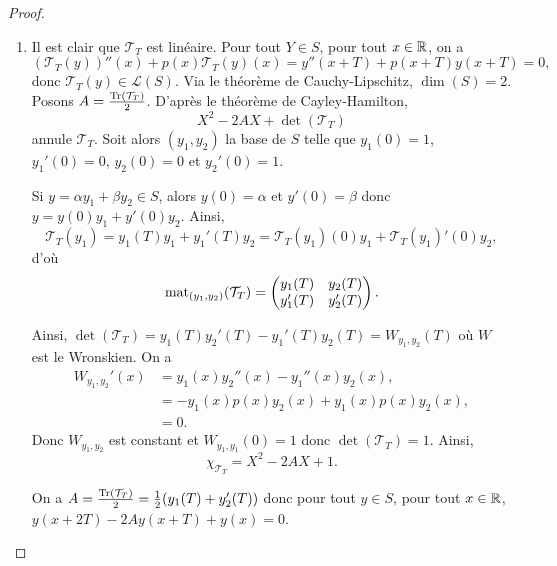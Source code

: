 \documentclass[12pt]{article}
\begin{document}
\begin{proof}
	\phantom{}
	\begin{enumerate}
		\item Il est clair que $\mathcal{T}_{T}$ est linéaire. Pour tout $Y\in S$, pour tout $x\in\mathbb{R}$, on a 
		\begin{equation*}
			(\mathcal{T}_{T}(y))''(x)+p(x)\mathcal{T}_{T}(y)(x)=y''(x+T)+p(x+T)y(x+T)=0,
		\end{equation*}
		donc $\mathcal{T}_{T}(y)\in\mathcal{L}(S)$. Via le théorème de Cauchy-Lipschitz, $\dim(S)=2$. Posons $A=\frac{\operatorname{Tr}(\mathcal{T}_T)}{2}$. D'après le théorème de Cayley-Hamilton, 
		\begin{equation*}
			X^{2}-2AX+\det(\mathcal{T}_T)
		\end{equation*}
		annule $\mathcal{T}_T$. Soit alors $(y_1,y_2)$ la base de $S$ telle que $y_1(0)=1$, $y_1'(0)=0$, $y_2(0)=0$ et $y_2'(0)=1$.

		Si $y=\alpha y_1+\beta y_2\in S$, alors $y(0)=\alpha$ et $y'(0)=\beta$ donc $y=y(0)y_1+y'(0)y_2$. Ainsi, 
		\begin{equation*}
			\mathcal{T}_T(y_1)=y_1(T)y_1+y_1'(T)y_2=\mathcal{T}_T(y_1)(0) y_1+\mathcal{T}_T(y_1)'(0) y_2,
		\end{equation*}
		d'où 
		\begin{equation*}
			\operatorname{mat}_{(y_1,y_2)}(\mathcal{T}_T)=\begin{pmatrix}
				y_{1}(T) & y_2(T)\\
				y_1'(T) & y_2'(T)
			\end{pmatrix}.
		\end{equation*}

		Ainsi, $\det(\mathcal{T}_{T})=y_1(T)y_2'(T)-y_1'(T)y_2(T)=W_{y_1,y_2}(T)$ où $W$ est le Wronskien. On a 
		\begin{align*}
			W_{y_1,y_2}'(x)
			&=y_1(x)y_2''(x)-y_1''(x)y_2(x),\\
			&=-y_1(x)p(x)y_2(x)+y_1(x)p(x)y_2(x),\\
			&=0.
		\end{align*}
		Donc $W_{y_1,y_2}$ est constant et $W_{y_1,y_1}(0)=1$ donc $\det(\mathcal{T}_T)=1$. Ainsi, 
		\begin{equation*}
			\chi_{\mathcal{T}_T}=X^{2}-2AX+1.
		\end{equation*}

		On a $A=\frac{\operatorname{Tr}(\mathcal{T}_T)}{2}=\frac{1}{2}(y_1(T)+y_2'(T))$ donc pour tout $y\in S$, pour tout $x\in\mathbb{R}$, $y(x+2T)-2Ay(x+T)+y(x)=0$.


\end{enumerate}
\end{proof}
\end{document}
